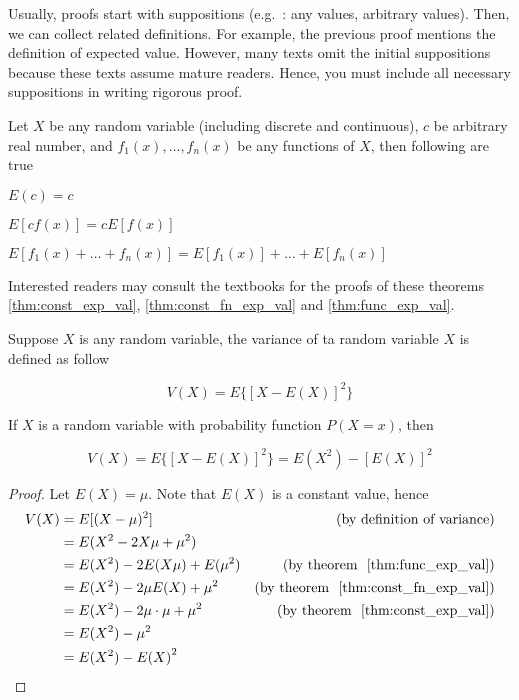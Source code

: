 Usually, proofs start with suppositions (e.g.~: any values, arbitrary values). 
Then, we can collect related definitions. 
For example, the previous proof mentions the definition of expected value.
However, many texts omit the initial suppositions 
because these texts assume mature readers. 
Hence, you must include all necessary suppositions in writing rigorous proof.


Let $X$ be any random variable (including discrete and continuous), $c$ be arbitrary real number, 
and $f_1(x), \ldots, f_n(x)$ be any functions of $X$, then following are true
\begin{theorem}\label{thm:const_exp_val}$E(c) = c$\end{theorem}
\begin{theorem}\label{thm:const_fn_exp_val}$E[cf(x)] = cE[f(x)]$\end{theorem}
\begin{theorem}\label{thm:func_exp_val}$E[f_1(x) + \ldots + f_n(x)]= E[f_1(x)] + \ldots + E[f_n(x)]$\end{theorem}

Interested readers may consult the textbooks for the proofs of these theorems \ref{thm:const_exp_val}, \ref{thm:const_fn_exp_val} and \ref{thm:func_exp_val}.

\begin{definition}
    Suppose $X$ is any random variable, the variance of ta random variable $X$ is defined as follow

    \[
        V(X) = E\{[X - E(X)]^2\}
    \]
\end{definition}

\begin{theorem}\label{thm:var_equivalent}
    If $X$ is a random variable with probability function $P(X = x)$, then

    \[
        V(X) = E\{[X - E(X)]^2\} = E(X^2) - {[E(X)]}^2    
    \]
\end{theorem}

\begin{proof}
    Let $E(X) = \mu$. Note that $E(X)$ is a constant value, hence
    \begin{align*}
        V(X) &= E[(X - \mu)^2]   & \text{(by definition of variance)}\\   
        &= E(X^2 - 2X\mu + \mu^2)    \\
        &= E(X^2) - 2E(X\mu) + E(\mu^2) & \text{(by theorem ~\ref{thm:func_exp_val})} \\
        &= E(X^2) - 2\mu E(X) + \mu^2  & \text{(by theorem ~\ref{thm:const_fn_exp_val})} \\
        &= E(X^2) - 2\mu\cdot\mu + \mu^2      & \text{(by theorem ~\ref{thm:const_exp_val})}\\
        &= E(X^2) - \mu^2 \\
        &= E(X^2) - {E(X)}^2
    \end{align*}
\end{proof}

